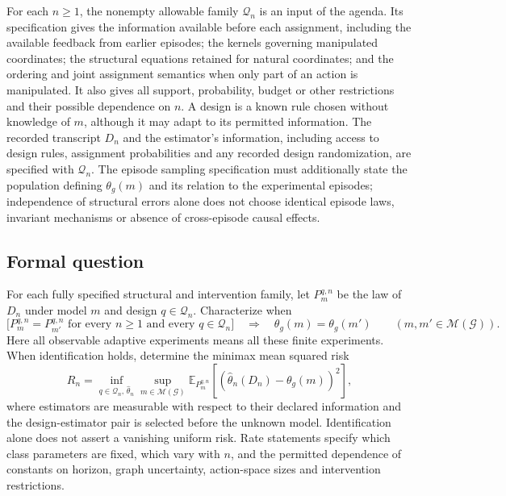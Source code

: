 \documentclass[11pt,a4paper]{article}
\newcommand{\E}{\mathbb E}
\begin{document}
For each $n\geq1$, the nonempty allowable family $\mathcal Q_n$ is an input of the agenda. Its specification gives the information available before each assignment, including the available feedback from earlier episodes; the kernels governing manipulated coordinates; the structural equations retained for natural coordinates; and the ordering and joint assignment semantics when only part of an action is manipulated. It also gives all support, probability, budget or other restrictions and their possible dependence on $n$. A design is a known rule chosen without knowledge of $m$, although it may adapt to its permitted information. The recorded transcript $D_n$ and the estimator's information, including access to design rules, assignment probabilities and any recorded design randomization, are specified with $\mathcal Q_n$. The episode sampling specification must additionally state the population defining $\theta_g(m)$ and its relation to the experimental episodes; independence of structural errors alone does not choose identical episode laws, invariant mechanisms or absence of cross-episode causal effects.
\subsection*{Formal question}
For each fully specified structural and intervention family, let $P_m^{q,n}$ be the law of $D_n$ under model $m$ and design $q\in\mathcal Q_n$. Characterize when
\[
 \bigl[P_m^{q,n}=P_{m'}^{q,n}\text{ for every }n\geq1
       \text{ and every }q\in\mathcal Q_n\bigr]
 \quad\Longrightarrow\quad \theta_g(m)=\theta_g(m')
 \qquad(m,m'\in\mathcal M(\mathcal G)).
\]
Here all observable adaptive experiments means all these finite experiments. When identification holds, determine the minimax mean squared risk
\[
 R_n=\inf_{q\in\mathcal Q_n,\,\widehat\theta_n}
       \sup_{m\in\mathcal M(\mathcal G)}
       \E_{P_m^{q,n}}[(\widehat\theta_n(D_n)-\theta_g(m))^2],
\]
where estimators are measurable with respect to their declared information and the design-estimator pair is selected before the unknown model. Identification alone does not assert a vanishing uniform risk. Rate statements specify which class parameters are fixed, which vary with $n$, and the permitted dependence of constants on horizon, graph uncertainty, action-space sizes and intervention restrictions.
\end{document}
